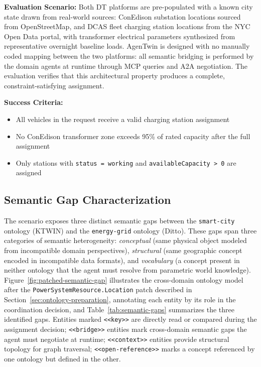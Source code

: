 \textbf{Evaluation Scenario:}
Both DT platforms are pre-populated with a known city state drawn from real-world sources:
    ConEdison substation locations sourced from OpenStreetMap,
    and DCAS fleet charging station locations from the NYC Open Data portal,
    with transformer electrical parameters synthesized from representative overnight baseline loads.
AgenTwin is designed with no manually coded mapping between the two platforms:
    all semantic bridging is performed by the domain agents at runtime
    through MCP queries and A2A negotiation.
    The evaluation verifies that this architectural property produces
    a complete, constraint-satisfying assignment.

\textbf{Success Criteria:}
\begin{itemize}
    \item All vehicles in the request receive a valid charging station assignment
    \item No ConEdison transformer zone exceeds 95\% of rated capacity after the full assignment
    \item Only stations with \texttt{status = working} and \texttt{availableCapacity > 0} are assigned
\end{itemize}

\subsection{Semantic Gap Characterization}
\label{subsec:semantic-gaps}

The scenario exposes three distinct semantic gaps between the
    \texttt{smart-city} ontology (KTWIN) and the
    \texttt{energy-grid} ontology (Ditto).
These gaps span three categories of semantic heterogeneity:
    \emph{conceptual} (same physical object modeled from incompatible domain perspectives),
    \emph{structural} (same geographic concept encoded in incompatible data formats), and
    \emph{vocabulary} (a concept present in neither ontology that the agent must resolve
    from parametric world knowledge).
Figure~\ref{fig:patched-semantic-gap} illustrates the cross-domain ontology model
    after the \texttt{PowerSystemResource.Location} patch described in
    Section~\ref{sec:ontology-preparation},
    annotating each entity by its role in the coordination decision,
    and Table~\ref{tab:semantic-gaps} summarizes the three identified gaps.
Entities marked \texttt{<<key>>} are directly read or compared during the assignment decision;
    \texttt{<<bridge>>} entities mark cross-domain semantic gaps the agent must negotiate at runtime;
    \texttt{<<context>>} entities provide structural topology for graph traversal;
    \texttt{<<open-reference>>} marks a concept referenced by one ontology but defined in the other.

